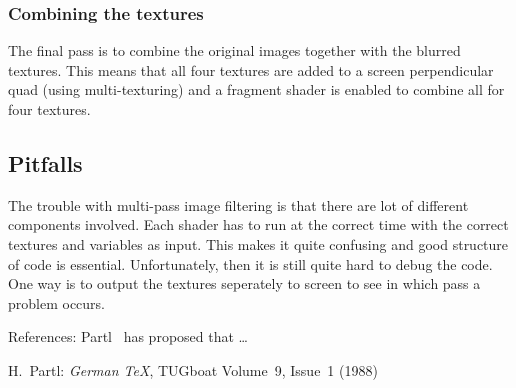 \documentclass[a4paper,12pt]{article}
\begin{document}
\subsubsection{Combining the textures}
\label{sec:CombiningTheTextures}

The final pass is to combine the original images together with the blurred textures. This means that all four textures are added to a screen perpendicular quad (using multi-texturing) and a fragment shader is enabled to combine all for four textures.

\subsection{Pitfalls}
\label{sec:PitfallsBloomShader}
The trouble with multi-pass image filtering is that there are lot of different components involved. Each shader has to run at the correct time with the correct textures and variables as input. This makes it quite confusing and good structure of code is essential. Unfortunately, then it is still quite hard to debug the code. One way is to output the textures seperately to screen to see in which pass a problem occurs.

References:
Partl~\cite{pa} has
proposed that \ldots
\begin{thebibliography}{99}
	 H.~Partl:
	\emph{German \TeX},
	TUGboat Volume~9, Issue~1 (1988)
\end{thebibliography}
\end{document}
